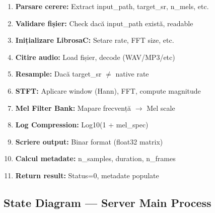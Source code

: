 \documentclass[12pt,a4paper,twoside]{article}
\begin{document}
\begin{enumerate}
    \item \textbf{Parsare cerere:} Extract input\_path, target\_sr, n\_mels, etc.
    \item \textbf{Validare fișier:} Check dacă input\_path există, readable
    \item \textbf{Inițializare LibrosaC:} Setare rate, FFT size, etc.
    \item \textbf{Citire audio:} Load fișier, decode (WAV/MP3/etc)
    \item \textbf{Resample:} Dacă target\_sr $\neq$ native rate
    \item \textbf{STFT:} Aplicare window (Hann), FFT, compute magnitude
    \item \textbf{Mel Filter Bank:} Mapare frecvență $\rightarrow$ Mel scale
    \item \textbf{Log Compression:} Log10(1 + mel\_spec)
    \item \textbf{Scriere output:} Binar format (float32 matrix)
    \item \textbf{Calcul metadate:} n\_samples, duration, n\_frames
    \item \textbf{Return result:} Status=0, metadate populate
\end{enumerate}

\subsection{State Diagram --- Server Main Process}
\end{document}
